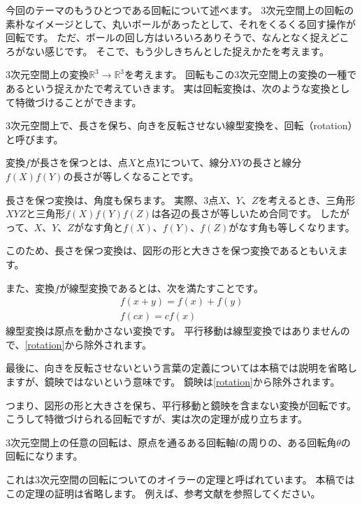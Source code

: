 \documentclass{jlreq}
\numberwithin{equation}{section}
\begin{document}
今回のテーマのもうひとつである回転について述べます。
3次元空間上の回転の素朴なイメージとして、丸いボールがあったとして、それをくるくる回す操作が回転です。
ただ、ボールの回し方はいろいろありそうで、なんとなく捉えどころがない感じです。
そこで、もう少しきちんとした捉えかたを考えます。

3次元空間上の変換\(\mathbb{R}^3\to\mathbb{R}^3\)を考えます。
回転もこの3次元空間上の変換の一種であるという捉えかたで考えていきます。
実は回転変換は、次のような変換として特徴づけることができます。

\begin{definition}\label{rotation}
    3次元空間上で、長さを保ち、向きを反転させない線型変換を、回転（rotation）と呼びます。
\end{definition}

変換\(f\)が長さを保つとは、点\(X\)と点\(Y\)について、線分\(XY\)の長さと線分\(f(X)f(Y)\)の長さが等しくなることです。

長さを保つ変換は、角度も保ちます。
実際、3点\(X\)、\(Y\)、\(Z\)を考えるとき、三角形\(XYZ\)と三角形\(f(X)f(Y)f(Z)\)は各辺の長さが等しいため合同です。
したがって、\(X\)、\(Y\)、\(Z\)がなす角と\(f(X)\)、\(f(Y)\)、\(f(Z)\)がなす角も等しくなります。

このため、長さを保つ変換は、図形の形と大きさを保つ変換であるともいえます。

また、変換\(f\)が線型変換であるとは、次を満たすことです。
\begin{gather}
    f(x+y)=f(x)+f(y)\\
    f(cx)=cf(x)
\end{gather}
線型変換は原点を動かさない変換です。
平行移動は線型変換ではありませんので、\autoref{rotation}から除外されます。

最後に、向きを反転させないという言葉の定義については本稿では説明を省略しますが、鏡映ではないという意味です。
鏡映は\autoref{rotation}から除外されます。

つまり、図形の形と大きさを保ち、平行移動と鏡映を含まない変換が回転です。
こうして特徴づけられる回転ですが、実は次の定理が成り立ちます。

\begin{theorem}
    3次元空間上の任意の回転は、原点を通るある回転軸\(l\)の周りの、ある回転角\(\theta\)の回転になります。
\end{theorem}

これは3次元空間の回転についてのオイラーの定理と呼ばれています。
本稿ではこの定理の証明は省略します。
例えば、参考文献\cite{kanatani}を参照してください。
\end{document}
